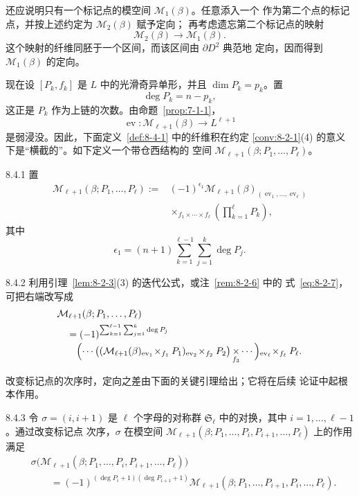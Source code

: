 还应说明只有一个标记点的模空间 $\mathcal M_1(\beta)$。任意添入一个
作为第二个点的标记点，并按上述约定为 $\mathcal M_2(\beta)$ 赋予定向；
再考虑遗忘第二个标记点的映射
\[
 \mathcal M_2(\beta)\longrightarrow\mathcal M_1(\beta).
\]
这个映射的纤维同胚于一个区间，而该区间由 $\partial D^2$ 典范地
定向，因而得到 $\mathcal M_1(\beta)$ 的定向。

现在设 $[P_k,f_k]$ 是 $L$ 中的光滑奇异单形，并且
$\dim P_k=p_k$。置
\[
 \deg P_k=n-p_k,
\]
这正是 $P_k$ 作为上链的次数。由命题~\ref{prop:7-1-1}，
\[
 \operatorname{ev}\colon\mathcal M_{\ell+1}(\beta)
 \longrightarrow L^{\ell+1}
\]
是弱浸没。因此，下面定义~\ref{def:8-4-1} 中的纤维积在约定
\ref{conv:8-2-1}(4) 的意义下是“横截的”。如下定义一个带仓西结构的
空间 $\mathcal M_{\ell+1}(\beta;P_1,\ldots,P_\ell)$。

\begin{definition}{8.4.1}\label{def:8-4-1}
置
\[
\begin{aligned}
 \mathcal M_{\ell+1}(\beta;P_1,\ldots,P_\ell)
 :={}&(-1)^{\epsilon_1}
 \mathcal M_{\ell+1}(\beta)_{
  (\operatorname{ev}_1,\ldots,\operatorname{ev}_\ell)}\\[-2pt]
 &{}\mathop{\times}_{f_1\times\cdots\times f_\ell}
 \left(\prod_{k=1}^{\ell}P_k\right),
\end{aligned}
\]
其中
\[
 \epsilon_1=(n+1)
 \sum_{k=1}^{\ell-1}\sum_{j=1}^{k}\deg P_j.
\]
\end{definition}

\begin{remark}{8.4.2}\label{rem:8-4-2}
利用引理~\ref{lem:8-2-3}(3) 的迭代公式，或注~\ref{rem:8-2-6} 中的
式~\eqref{eq:8-2-7}，可把右端改写成
\[
\begin{aligned}
 &\mathcal M_{\ell+1}(\beta;P_1,\ldots,P_\ell)\\
 &\quad={}
 (-1)^{\sum_{k=1}^{\ell-1}\sum_{j=1}^{k}\deg P_j}\\[-2pt]
 &\qquad{}
 \Bigl(\cdots
   \bigl((\mathcal M_{\ell+1}(\beta)
      {}_{\operatorname{ev}_1}\!\times_{f_1}P_1)
      {}_{\operatorname{ev}_2}\!\times_{f_2}P_2\bigr)
      \mathop{\times}_{f_3}\cdots\Bigr)
      {}_{\operatorname{ev}_\ell}\!\times_{f_\ell}P_\ell.
\end{aligned}
\]
\end{remark}

改变标记点的次序时，定向之差由下面的关键引理给出；它将在后续
论证中起根本作用。

\begin{lemma}{8.4.3}\label{lem:8-4-3}
令 $\sigma=(i,i+1)$ 是 $\ell$ 个字母的对称群
$\mathfrak S_\ell$ 中的对换，其中 $i=1,\ldots,\ell-1$。通过改变标记点
次序，$\sigma$ 在模空间
$\mathcal M_{\ell+1}(\beta;P_1,\ldots,P_i,P_{i+1},\ldots,P_\ell)$
上的作用满足
\[
\begin{aligned}
 &\sigma\bigl(
 \mathcal M_{\ell+1}(\beta;P_1,\ldots,P_i,P_{i+1},\ldots,P_\ell)
 \bigr)\\
 &\qquad={}
 (-1)^{(\deg P_i+1)(\deg P_{i+1}+1)}
 \mathcal M_{\ell+1}
 (\beta;P_1,\ldots,P_{i+1},P_i,\ldots,P_\ell).
\end{aligned}
\]
\end{lemma}


